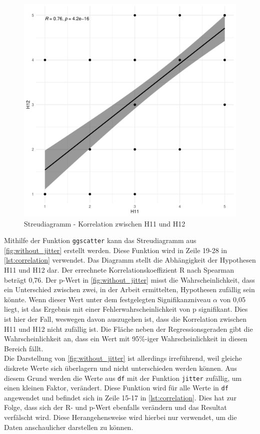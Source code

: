 \begin{figure}[H]
  \centering
  \includegraphics[width=0.65\columnwidth]{figures/plots/without_jitter.pdf}
  \caption{\label{fig:without_jitter} Streudiagramm - Korrelation zwischen H11 und H12}
\end{figure}

Mithilfe der Funktion \texttt{ggscatter} kann das Streudiagramm aus \autoref{fig:without_jitter} erstellt werden.
Diese Funktion wird in Zeile 19-28 in \autoref{lst:correlation} verwendet.
Das Diagramm stellt die Abhängigkeit der Hypothesen H11 und H12 dar.
Der errechnete Korrelationskoeffizient R nach Spearman beträgt 0,76.
Der p-Wert in \autoref{fig:without_jitter} misst die Wahrscheinlichkeit, dass ein Unterschied zwischen zwei, in der Arbeit ermittelten, Hypothesen zufällig sein könnte.
Wenn dieser Wert unter dem festgelegten Signifikanzniveau $\alpha$ von 0,05 liegt, ist das Ergebnis mit einer Fehlerwahrscheinlichkeit von p signifikant\cite[S.350]{elementare-stochastik}.
Dies ist hier der Fall, weswegen davon auszugehen ist, dass die Korrelation zwischen H11 und H12 nicht zufällig ist.
Die Fläche neben der Regressionsgeraden gibt die Wahrscheinlichkeit an, dass ein Wert mit 95\%-iger Wahrscheinlichkeit in diesen Bereich fällt.\\

Die Darstellung von \autoref{fig:without_jitter} ist allerdings irreführend, weil gleiche diskrete Werte sich überlagern und nicht unterschieden werden können.
Aus diesem Grund werden die Werte aus \texttt{df} mit der Funktion \texttt{jitter}\cite{jitter} zufällig, um einen kleinen Faktor, verändert.
Diese Funktion wird für alle Werte in \texttt{df} angewendet und befindet sich in Zeile 15-17 in \autoref{lst:correlation}.
Dies hat zur Folge, dass sich der R- und p-Wert ebenfalls verändern und das Resultat verfälscht wird.
Diese Herangehensweise wird hierbei nur verwendet, um die Daten anschaulicher darstellen zu können.

